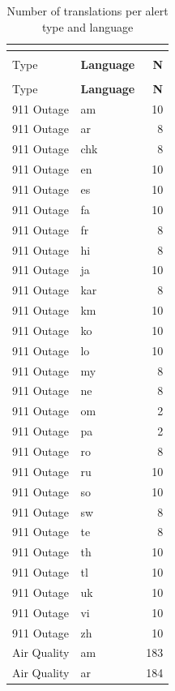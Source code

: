 \begin{longtable}{p{3cm} p{3cm} r}
\caption{Number of translations per alert type and language} \\
\label{tab:translations_full} \\
\hline
\textbf{Alert\\Type} & \textbf{Language} & \textbf{N} \\
\hline
\endfirsthead

\hline
\textbf{Alert\\Type} & \textbf{Language} & \textbf{N} \\
\hline
\endhead

\hline
\endfoot

\hline
\endlastfoot

911 Outage & am & 10 \\
911 Outage & ar & 8 \\
911 Outage & chk & 8 \\
911 Outage & en & 10 \\
911 Outage & es & 10 \\
911 Outage & fa & 10 \\
911 Outage & fr & 8 \\
911 Outage & hi & 8 \\
911 Outage & ja & 10 \\
911 Outage & kar & 8 \\
911 Outage & km & 10 \\
911 Outage & ko & 10 \\
911 Outage & lo & 10 \\
911 Outage & my & 8 \\
911 Outage & ne & 8 \\
911 Outage & om & 2 \\
911 Outage & pa & 2 \\
911 Outage & ro & 8 \\
911 Outage & ru & 10 \\
911 Outage & so & 10 \\
911 Outage & sw & 8 \\
911 Outage & te & 8 \\
911 Outage & th & 10 \\
911 Outage & tl & 10 \\
911 Outage & uk & 10 \\
911 Outage & vi & 10 \\
911 Outage & zh & 10 \\
Air Quality & am & 183 \\
Air Quality & ar & 184 \\

\end{longtable}
